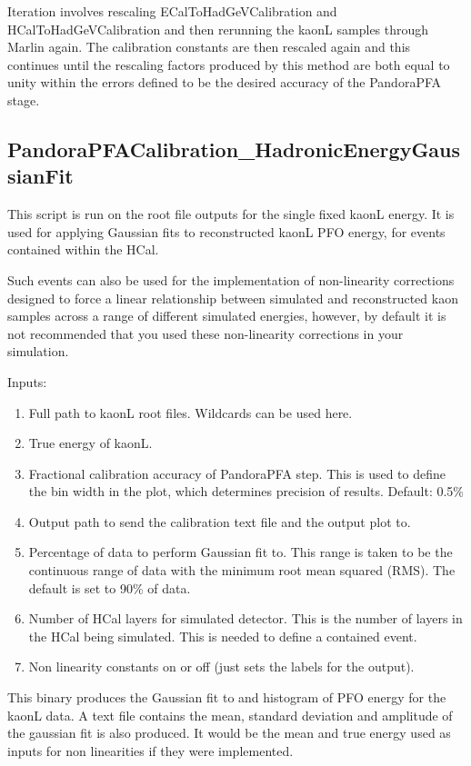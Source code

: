 \documentclass[11pt, oneside]{article}   	%
\begin{document}
Iteration involves rescaling ECalToHadGeVCalibration and HCalToHadGeVCalibration and then rerunning the kaonL samples through Marlin again.  The calibration constants are then rescaled again and this continues until the rescaling factors produced by this method are both equal to unity within the errors defined to be the desired accuracy of the PandoraPFA stage.  

\subsection{PandoraPFACalibration\_HadronicEnergyGaussianFit}

This script is run on the root file outputs for the single fixed kaonL energy.  It is used for applying Gaussian fits to reconstructed kaonL PFO energy, for events contained within the HCal.  

Such events can also be used for the implementation of non-linearity corrections designed to force a linear relationship between simulated and reconstructed kaon samples across a range of different simulated energies, however, by default it is not recommended that you used these non-linearity corrections in your simulation.

Inputs:
\begin{enumerate}
\item Full path to kaonL root files.  Wildcards can be used here.
\item True energy of kaonL.
\item Fractional calibration accuracy of PandoraPFA step.  This is used to define the bin width in the plot, which determines precision of results.  Default: 0.5\%
\item Output path to send the calibration text file and the output plot to.
\item Percentage of data to perform Gaussian fit to.  This range is taken to be the continuous range of data with the minimum root mean squared (RMS).  The default is set to 90\% of data.
\item Number of HCal layers for simulated detector.  This is the number of layers in the HCal being simulated.  This is needed to define a contained event.
\item Non linearity constants on or off (just sets the labels for the output).
\end{enumerate}

This binary produces the Gaussian fit to and histogram of PFO energy for the kaonL data.  A text file contains the mean, standard deviation and amplitude of the gaussian fit is also produced.  It would be the mean and true energy used as inputs for non linearities if they were implemented.
\end{document}
